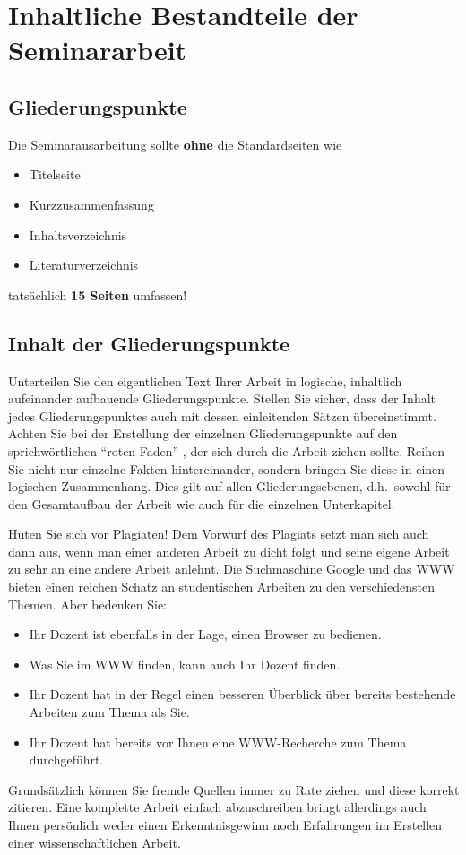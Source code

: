 %
\section{Inhaltliche Bestandteile der Seminararbeit}
\label{sec_inhalt}

\subsection{Gliederungspunkte}

Die Seminarausarbeitung sollte {\bf ohne} die Standardseiten wie
\begin{itemize}
\item Titelseite
\item Kurzzusammenfassung
\item Inhaltsverzeichnis
\item Literaturverzeichnis
\end{itemize}
tatsächlich {\bf 15 Seiten} umfassen!

\subsection{Inhalt der Gliederungspunkte}
Unterteilen Sie den eigentlichen Text Ihrer Arbeit in logische, inhaltlich aufeinander aufbauende Gliederungspunkte.
Stellen Sie sicher, dass der Inhalt jedes Gliederungspunktes auch mit dessen einleitenden Sätzen übereinstimmt.
Achten Sie bei der Erstellung der einzelnen Gliederungspunkte auf den sprichwörtlichen "`roten Faden"' , der sich durch die Arbeit ziehen sollte.
Reihen Sie nicht nur einzelne Fakten hintereinander, sondern bringen Sie diese in einen logischen Zusammenhang.
Dies gilt auf allen Gliederungsebenen, d.h.~sowohl für den Gesamtaufbau der Arbeit wie auch für die einzelnen Unterkapitel.

Hüten Sie sich vor Plagiaten!
Dem Vorwurf des Plagiats setzt man sich auch dann aus, wenn man einer anderen Arbeit zu dicht folgt und seine eigene Arbeit zu sehr an eine andere Arbeit anlehnt.
Die Suchmaschine Google und das WWW bieten einen reichen Schatz an studentischen Arbeiten zu den verschiedensten Themen.
Aber bedenken Sie:
\begin{itemize}
\item Ihr Dozent ist ebenfalls in der Lage, einen Browser zu bedienen.
\item Was Sie im WWW finden, kann auch Ihr Dozent finden.
\item Ihr Dozent hat in der Regel einen besseren Überblick über bereits bestehende Arbeiten zum Thema als Sie.
\item Ihr Dozent hat bereits vor Ihnen eine WWW-Recherche zum Thema durchgeführt.
\end{itemize}
Grundsätzlich können Sie fremde Quellen immer zu Rate ziehen und diese korrekt zitieren.
Eine komplette Arbeit einfach abzuschreiben bringt allerdings auch Ihnen persönlich weder einen Erkenntnisgewinn noch Erfahrungen im Erstellen einer wissenschaftlichen Arbeit.


